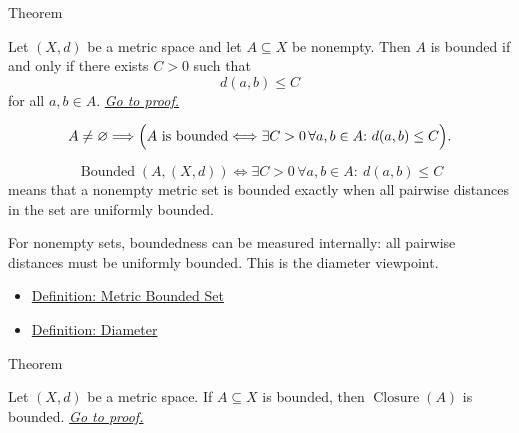 \begin{theorembox}{Theorem}
\begin{theorem}\label{thm:metric-boundedness-via-diameter}
Let \((X,d)\) be a metric space and let \(A\subseteq X\) be nonempty.  Then
\(A\) is bounded if and only if there exists \(C>0\) such that
\[
  d(a,b)\leq C
\]
for all \(a,b\in A\).
\hyperref[prf:metric-boundedness-via-diameter]{\textit{Go to proof.}}
\end{theorem}
\end{theorembox}

\begin{remark*}
\[
A\neq\varnothing
\Longrightarrow
\Bigl(
A\text{ is bounded}
\Longleftrightarrow
\exists C>0\,\forall a,b\in A{:}\ d(a,b)\leq C
\Bigr).
\]
\end{remark*}

\begin{remark*}
\[
\operatorname{Bounded}(A,(X,d))
\Longleftrightarrow
\exists C>0\,\forall a,b\in A{:}\ d(a,b)\leq C
\]
means that a nonempty metric set is bounded exactly when all pairwise
distances in the set are uniformly bounded.
\end{remark*}

\begin{remark*}[Interpretation]
For nonempty sets, boundedness can be measured internally: all pairwise
distances must be uniformly bounded.  This is the diameter viewpoint.
\end{remark*}

\begin{dependencies}
\begin{itemize}
  \item \hyperref[def:metric-bounded-set]{Definition: Metric Bounded Set}
  \item \hyperref[def:metric-diameter]{Definition: Diameter}
\end{itemize}
\end{dependencies}

\begin{theorembox}{Theorem}
\begin{theorem}
\label{thm:metric-closure-bounded-set-bounded}
Let \((X,d)\) be a metric space.  If \(A\subseteq X\) is bounded, then
\(\operatorname{Closure}(A)\) is bounded.
\hyperref[prf:metric-closure-bounded-set-bounded]{\textit{Go to proof.}}
\end{theorem}
\end{theorembox}

